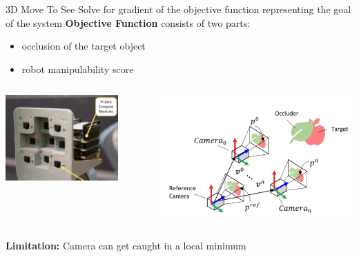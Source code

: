 \documentclass{beamer}
\begin{document}
\begin{frame}[t]{3D Move To See}
    \small
    Solve for gradient of the objective function representing the goal of the system
    \newline
    \textbf{Objective Function} consists of two parts:
    \begin{itemize}[label=-]
        \item occlusion of the target object
        \item robot manipulability score
    \end{itemize}
    \begin{columns}
		\begin{column}{.5\textwidth}
            \begin{center}
                \includegraphics[width=0.8\textwidth]{./img/3d_move_to_see_0.png}
            \end{center}
		\end{column}
		\hspace{1em}
		\begin{column}{.5\textwidth}
                \includegraphics[width=1.\textwidth]{./img/3d_move_to_see_1.png}
		\end{column}
	\end{columns}
    \vspace{1em}


    \textbf{Limitation:}  Camera can get caught in a local minimum
\end{frame}
\end{document}
